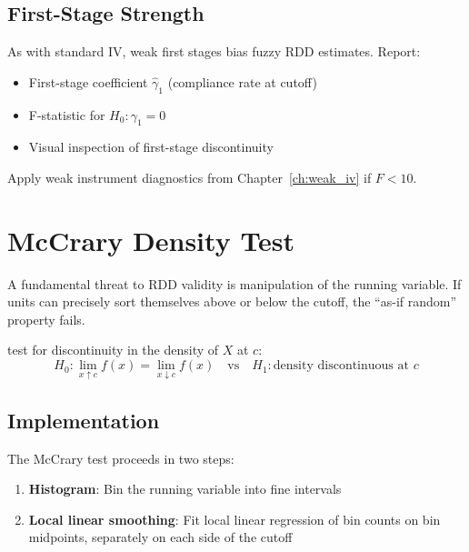 \subsection{First-Stage Strength}

\begin{remark}
As with standard IV, weak first stages bias fuzzy RDD estimates. Report:
\begin{itemize}
    \item First-stage coefficient $\hat{\gamma}_1$ (compliance rate at cutoff)
    \item F-statistic for $H_0: \gamma_1 = 0$
    \item Visual inspection of first-stage discontinuity
\end{itemize}
Apply weak instrument diagnostics from Chapter~\ref{ch:weak_iv} if $F < 10$.
\end{remark}

\section{McCrary Density Test}
\label{sec:rdd_mccrary}

A fundamental threat to RDD validity is manipulation of the running variable. If units can precisely sort themselves above or below the cutoff, the ``as-if random'' property fails.

\begin{definition}
\label{def:mccrary}
\citet{mccrary2008manipulation} test for discontinuity in the density of $X$ at $c$:
\begin{equation}
    H_0: \lim_{x \uparrow c} f(x) = \lim_{x \downarrow c} f(x) \quad \text{vs} \quad H_1: \text{density discontinuous at } c
\end{equation}
\end{definition}

\subsection{Implementation}

The McCrary test proceeds in two steps:

\begin{enumerate}
    \item \textbf{Histogram}: Bin the running variable into fine intervals
    \item \textbf{Local linear smoothing}: Fit local linear regression of bin counts on bin midpoints, separately on each side of the cutoff
\end{enumerate}

